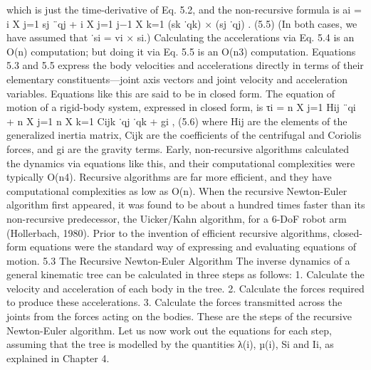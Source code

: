 which is just the time-derivative of Eq. 5.2, and the non-recursive formula is ai = i X j=1 sj ¨qj + i X j=1 j−1 X k=1 (sk ˙qk) × (sj ˙qj) . (5.5) (In both cases, we have assumed that ˙si = vi × si.) Calculating the accelerations via Eq. 5.4 is an O(n) computation; but doing it via Eq. 5.5 is an O(n3) computation. Equations 5.3 and 5.5 express the body velocities and accelerations directly in terms of their elementary constituents—joint axis vectors and joint velocity and acceleration variables. Equations like this are said to be in closed form. The equation of motion of a rigid-body system, expressed in closed form, is τi = n X j=1 Hij ¨qi + n X j=1 n X k=1 Cijk ˙qj ˙qk + gi , (5.6) where Hij are the elements of the generalized inertia matrix, Cijk are the coefficients of the centrifugal and Coriolis forces, and gi are the gravity terms. Early, non-recursive algorithms calculated the dynamics via equations like this, and their computational complexities were typically O(n4). Recursive algorithms are far more efficient, and they have computational complexities as low as O(n). When the recursive Newton-Euler algorithm first appeared, it was found to be about a hundred times faster than its non-recursive predecessor, the Uicker/Kahn algorithm, for a 6-DoF robot arm (Hollerbach, 1980). Prior to the invention of efficient recursive algorithms, closed-form equations were the standard way of expressing and evaluating equations of motion. 5.3 The Recursive Newton-Euler Algorithm The inverse dynamics of a general kinematic tree can be calculated in three steps as follows: 1. Calculate the velocity and acceleration of each body in the tree. 2. Calculate the forces required to produce these accelerations. 3. Calculate the forces transmitted across the joints from the forces acting on the bodies. These are the steps of the recursive Newton-Euler algorithm. Let us now work out the equations for each step, assuming that the tree is modelled by the quantities λ(i), µ(i), Si and Ii, as explained in Chapter 4.

